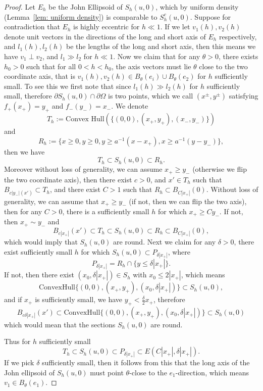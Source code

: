 \documentclass[12pt,reqno]{amsart}
\numberwithin{equation}{section}
\begin{document}
\begin{proof}
            Let $E_h$ be the John Ellipsoid of $S_h(u, 0)$, which by uniform density (Lemma~\ref{lem: uniform density}) is comparable to $S^c_h(u, 0)$. Suppose for contradiction that $E_h$ is highly eccentric for $h\ll 1$. If we let $v_1(h), v_2(h)$ denote unit vectors in the directions of the long and short axis of $E_h$ respectively, and $l_1(h), l_2(h)$ be the lengths of the long and short axis, then this means we have $v_1\perp v_2$, and $l_1\gg l_2$ for $h\ll 1$. Now we claim that for any $\theta>0$, there exists $h_0>0$ such that for all $0<h<h_0$, the axis vectors must lie $\theta$ close to the two coordinate axis, that is $v_1(h), v_2(h)\in B_{\theta}(e_i)\cup B_{\theta}(e_2)$ for $h$ sufficiently small. To see this we first note that since $l_1(h)\gg l_2(h)$ for $h$ sufficiently small, therefore $\partial S_h(u, 0)\cap \partial\Omega$ is two points, which we call $(x^{\pm}, y^{\pm})$ satisfying $f_{+}(x_+) = y_+$ and $f_-(y_-) = x_-$. We denote 
            \[T_h := \text{Convex Hull}(\{(0, 0), (x_+, y_+), (x_-, y_-)\})\]
            and 
            \[R_h := \{x\geq 0, y\geq 0, y\geq a^{-1}(x-x_+), x\geq a^{-1}(y-y_-) \}, \]
            then we have
            \[T_h\subset S_h(u, 0)\subset R_h.\]
            Moreover without loss of generality, we can assume $x_+\geq y_-$ (otherwise we flip the two coordinate axis), then there exist $c>0$, and $x'\in T_h$ such that $B_{c|y_-|(x')}\subset T_h$, and there exist $C>1$ such that $R_h\subset B_{C|x_+|}(0)$. 
            Without loss of generality, we can assume that $x_+\geq y_-$ (if not, then we can flip the two axis), then for any $C>0$, there is a sufficiently small $h$ for which $x_+\geq Cy_-$. If not, then $x_+\sim y_-$ and
            \[B_{c|x_+|}(x')\subset T_h \subset S_h(u, 0)\subset R_h\subset B_{C|x_+|}(0),\] 
            which would imply that $S_h(u, 0)$ are round. Next we claim for any $\delta>0$, there exist sufficiently small $h$ for which $S_h(u, 0)\subset P_{\delta|x_+|}$, where
            \[P_{\delta|x_+|} = R_h\cap\{y\leq \delta|x_+|\}. \]
            If not, then there exist $(x_0, \delta|x_+|)\in S_h$ with $x_0\leq 2|x_+|$, which means
            \[ \text{ConvexHull}\{(0, 0), (x_+, y_+), (x_0, \delta|x_+|)\}\subset S_h(u, 0),\]
            and if $x_+$ is sufficiently small, we have $y_+<\frac{\delta}{2}x_+$, therefore
            \[B_{c\delta |x_+|}(x')\subset \text{ConvexHull}\{(0, 0), (x_+, y_+), (x_0, \delta|x_+|)\}\subset S_h(u, 0)\]
            which would mean that the sections $S_h(u, 0)$ are round. 
            
            Thus for $h$ sufficiently small
            \[T_h\subset S_h(u, 0)\subset P_{\delta|x_+|}\subset E(C|x_+|, \delta|x_+|).\]
            If we pick $\delta$ sufficiently small, then it follows from this that the long axis of the John ellipsoid of $S_h(u, 0)$ must point $\theta$-close to the $e_1$-direction, which means $v_1\in B_{\theta}(e_1)$. 


\end{proof}
\end{document}
